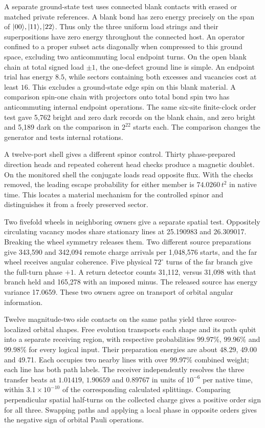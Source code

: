 A separate ground-state test uses connected blank contacts with erased or
matched private references. A blank bond has zero energy precisely on
the span of $\lvert 00\rangle,\lvert 11\rangle,\lvert 22\rangle$. Thus only the three uniform
load strings and their superpositions have zero energy throughout the
connected host. An operator confined to a proper subset acts diagonally
when compressed to this ground space, excluding two anticommuting local
endpoint turns. On the open blank chain at total signed load $\pm1$, the
one-defect ground line is simple. An endpoint trial has energy $8.5$,
while sectors containing both excesses and vacancies cost at least $16$.
This excludes a ground-state edge spin on this blank material.
A comparison spin-one chain with projectors onto total bond spin two has
anticommuting internal endpoint operations. The same six-site finite-clock
order test gave 5,762 bright and zero dark records on the blank chain,
and zero bright and 5,189 dark on the comparison in $2^{22}$ starts each.
The comparison changes the generator and tests internal rotations.

A twelve-port shell gives a different spinor control. Thirty
phase-prepared direction heads and repeated coherent head checks
produce a magnetic doublet. On the monitored shell the conjugate
loads read opposite flux. With the checks removed, the leading escape probability for either member is $74.0260\,t^2$ in native time. This locates a material mechanism for the controlled
spinor and distinguishes it from a freely preserved sector.

Two fivefold wheels in neighboring owners give a separate spatial test.
Oppositely circulating vacancy modes share stationary lines at
25.190983 and 26.309017. Breaking the wheel symmetry releases them.
Two different source preparations give 343,590 and 342,094 remote
charge arrivals per 1,048,576 starts, and the far wheel receives angular
coherence. Five physical $72^\circ$ turns of the far branch give the
full-turn phase $+1$. A return detector counts 31,112, versus 31,098
with that branch held and 165,278 with an imposed minus. The released
source has energy variance 17.0659. These two owners agree on
transport of orbital angular information.

Twelve magnitude-two side contacts on the same paths yield three
source-localized orbital shapes. Free evolution transports each shape
and its path qubit into a separate receiving region, with respective
probabilities $99.97\%$, $99.96\%$ and $99.98\%$ for every logical
input. Their preparation energies are about 48.29, 49.00 and 49.71.
Each occupies two nearby lines with over $99.97\%$ combined weight;
each line has both path labels. The receiver independently resolves
the three transfer beats at $1.01419$, $1.90659$ and $0.89767$ in
units of $10^{-6}$ per native time, within $3.1\times10^{-10}$ of
the corresponding calculated splittings. Comparing perpendicular spatial
half-turns on the collected charge gives a positive order sign for
all three. Swapping paths and applying a local phase in opposite
orders gives the negative sign of orbital Pauli operations.

